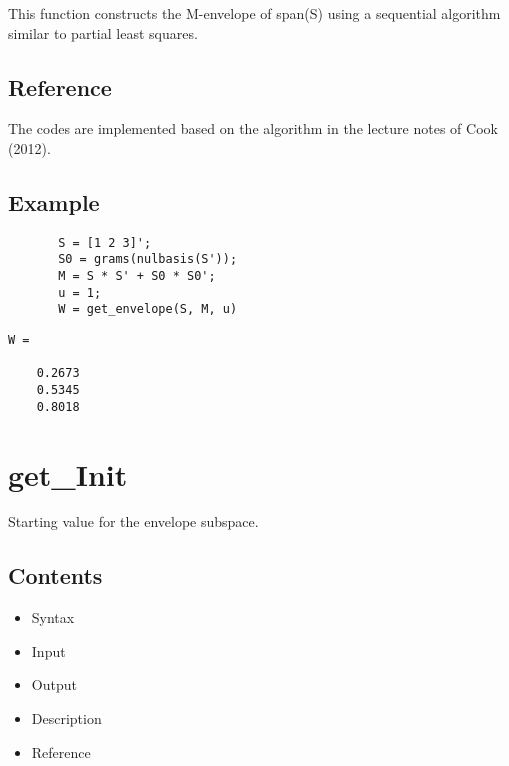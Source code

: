 \documentclass[a4paper,11pt,openany]{memoir}
\begin{document}
\begin{par}
This function constructs the M-envelope of span(S) using a sequential algorithm similar to partial least squares.
\end{par} \vspace{1em}


\subsection*{Reference}

\begin{par}
The codes are implemented based on the algorithm in the lecture notes of Cook (2012).
\end{par} \vspace{1em}

\subsection*{Example}


\begin{verbatim}       S = [1 2 3]';
       S0 = grams(nulbasis(S'));
       M = S * S' + S0 * S0';
       u = 1;
       W = get_envelope(S, M, u)\end{verbatim}
    
        \color{lightgray}\ttfamily \begin{verbatim}
W =

    0.2673
    0.5345
    0.8018

\end{verbatim} \rmfamily\color{black}
    
\newpage 

\rmfamily
\color{black}\section{get\_Init}

\begin{par}
Starting value for the envelope subspace.
\end{par} \vspace{1em}

\subsection*{Contents}

\begin{itemize}
\setlength{\itemsep}{-1ex}
   \item Syntax
   \item Input
   \item Output
   \item Description
   \item Reference
\end{itemize}
\end{document}
